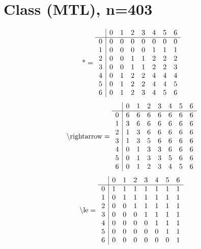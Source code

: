 \documentclass[11pt]{article}
\begin{document}
\section{Class (MTL), n=403}
\[\text{*} = 
\begin{array}{r | r r r r r r r}
 & 0 & 1 & 2 & 3 & 4 & 5 & 6 \\ \hline
0 & 0 & 0 & 0 & 0 & 0 & 0 & 0 \\
1 & 0 & 0 & 0 & 0 & 1 & 1 & 1 \\
2 & 0 & 0 & 1 & 1 & 2 & 2 & 2 \\
3 & 0 & 0 & 1 & 1 & 2 & 2 & 3 \\
4 & 0 & 1 & 2 & 2 & 4 & 4 & 4 \\
5 & 0 & 1 & 2 & 2 & 4 & 4 & 5 \\
6 & 0 & 1 & 2 & 3 & 4 & 5 & 6 \\
\end{array}
\]
\[\text{\textbackslash rightarrow} = 
\begin{array}{r | r r r r r r r}
 & 0 & 1 & 2 & 3 & 4 & 5 & 6 \\ \hline
0 & 6 & 6 & 6 & 6 & 6 & 6 & 6 \\
1 & 3 & 6 & 6 & 6 & 6 & 6 & 6 \\
2 & 1 & 3 & 6 & 6 & 6 & 6 & 6 \\
3 & 1 & 3 & 5 & 6 & 6 & 6 & 6 \\
4 & 0 & 1 & 3 & 3 & 6 & 6 & 6 \\
5 & 0 & 1 & 3 & 3 & 5 & 6 & 6 \\
6 & 0 & 1 & 2 & 3 & 4 & 5 & 6 \\
\end{array}
\]
\[\text{\textbackslash le} = 
\begin{array}{r | r r r r r r r}
 & 0 & 1 & 2 & 3 & 4 & 5 & 6 \\ \hline
0 & 1 & 1 & 1 & 1 & 1 & 1 & 1 \\
1 & 0 & 1 & 1 & 1 & 1 & 1 & 1 \\
2 & 0 & 0 & 1 & 1 & 1 & 1 & 1 \\
3 & 0 & 0 & 0 & 1 & 1 & 1 & 1 \\
4 & 0 & 0 & 0 & 0 & 1 & 1 & 1 \\
5 & 0 & 0 & 0 & 0 & 0 & 1 & 1 \\
6 & 0 & 0 & 0 & 0 & 0 & 0 & 1 \\
\end{array}
\]
\end{document}
